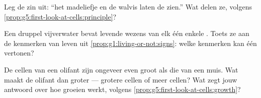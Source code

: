 \begin{exercise}[$\star\star$]\label{exo:g5:first-look-at-cells:9}
Leg de zin uit: ``het madeliefje en de walvis laten de  zien.'' Wat delen ze, volgens
\cref{prop:g5:first-look-at-cells:principle}?
\end{exercise}

\begin{exercise}[$\star\star$]\label{exo:g5:first-look-at-cells:10}
Een druppel vijverwater bevat levende wezens van elk één enkele .
Toets ze aan de kenmerken van leven uit
\cref{prop:g1:living-or-not:signs}: welke kenmerken kan één  vertonen?
\end{exercise}

\begin{exercise}[$\star\star\star$]\label{exo:g5:first-look-at-cells:11}
De cellen van een olifant zijn ongeveer even groot als die van een muis.
Wat maakt de olifant dan groter --- grotere cellen of meer cellen? Wat
zegt jouw antwoord over hoe groeien werkt, volgens
\cref{prop:g5:first-look-at-cells:growth}?
\end{exercise}
